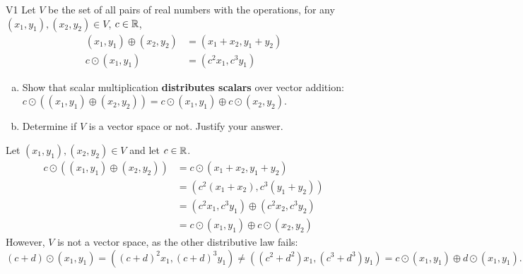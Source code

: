 \documentclass{sbgLAexam}
\begin{document}
\begin{extract}\newpage\end{extract}
\begin{problem}{V1}
Let $V$ be the set of all pairs of real numbers with the operations, for any $(x_1,y_1), (x_2,y_2) \in V$, $c \in \mathbb{R}$,
\begin{align*}
(x_1,y_1) \oplus (x_2,y_2) &= (x_1+x_2,y_1+y_2) \\
c \odot (x_1,y_1) &= (c^2x_1, c^3y_1)
\end{align*}
\begin{enumerate}[(a)]
\item Show that scalar multiplication \textbf{distributes scalars} over
      vector addition:
      \(c\odot((x_1,y_1) \oplus (x_2,y_2))=
      c\odot(x_1,y_1) \oplus c\odot(x_2,y_2)\).
\item Determine if $V$ is a vector space or not.  Justify your answer.
\end{enumerate}
\end{problem}
\begin{solution}
Let $(x_1,y_1), (x_2,y_2) \in V$ and let $c \in \mathbb{R}$.
\begin{align*}
c \odot \left( (x_1,y_1) \oplus (x_2,y_2) \right) &= c \odot (x_1+x_2,y_1+y_2) \\
&= (c^2(x_1+x_2), c^3(y_1+y_2) ) \\
&= (c^2x_1,c^3y_1) \oplus (c^2x_2,c^3y_2) \\
&= c \odot (x_1,y_1) \oplus c \odot (x_2,y_2)
\end{align*}
However, $V$ is not a vector space, as the other distributive law fails:
$$(c+d) \odot (x_1,y_1) = ( (c+d)^2 x_1, (c+d)^3 y_1) \neq ((c^2+d^2)x_1, (c^3+d^3)y_1) = c \odot (x_1,y_1) \oplus d \odot (x_1,y_1).$$
\end{solution}
\end{document}
